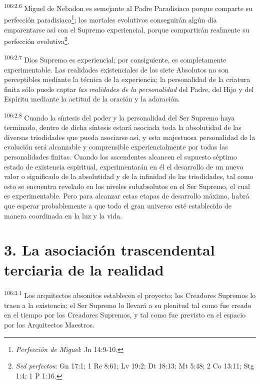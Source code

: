 \par
\textsuperscript{106:2.6} Miguel de Nebadon es semejante al Padre Paradisiaco porque comparte su perfección paradisiaca\footnote{\textit{Perfección de Miguel}: Jn 14:9-10.}; los mortales evolutivos conseguirán algún día emparentarse así con el Supremo experiencial, porque compartirán realmente su perfección evolutiva\footnote{\textit{Sed perfectos}: Gn 17:1; 1 Re 8:61; Lv 19:2; Dt 18:13; Mt 5:48; 2 Co 13:11; Stg 1:4; 1 P 1:16.}.

\par
\textsuperscript{106:2.7} Dios Supremo es experiencial; por consiguiente, es completamente experimentable. Las realidades existenciales de los siete Absolutos no son perceptibles mediante la técnica de la experiencia; la personalidad de la criatura finita sólo puede captar \textit{las realidades de la personalidad} del Padre, del Hijo y del Espíritu mediante la actitud de la oración y la adoración.

\par
\textsuperscript{106:2.8} Cuando la síntesis del poder y la personalidad del Ser Supremo haya terminado, dentro de dicha síntesis estará asociada toda la absolutidad de las diversas triodidades que pueda asociarse así, y esta majestuosa personalidad de la evolución será alcanzable y comprensible experiencialmente por todas las personalidades finitas. Cuando los ascendentes alcancen el supuesto séptimo estado de existencia espiritual, experimentarán en él el desarrollo de un nuevo valor o significado de la absolutidad y de la infinidad de las triodidades, tal como esto se encuentra revelado en los niveles subabsolutos en el Ser Supremo, el cual es experimentable. Pero para alcanzar estas etapas de desarrollo máximo, habrá que esperar probablemente a que todo el gran universo esté establecido de manera coordinada en la luz y la vida.

\section*{3. La asociación trascendental terciaria de la realidad}
\par
\textsuperscript{106:3.1} Los arquitectos absonitos establecen el proyecto; los Creadores Supremos lo traen a la existencia; el Ser Supremo lo llevará a su plenitud tal como fue creado en el tiempo por los Creadores Supremos, y tal como fue previsto en el espacio por los Arquitectos Maestros.

